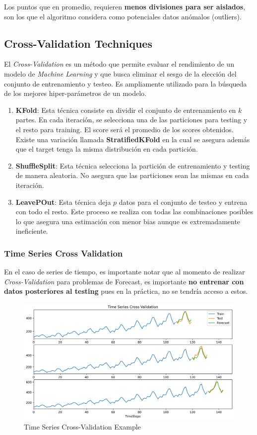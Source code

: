 Los puntos que en promedio, requieren \textbf{menos divisiones para ser aislados}, son los que el algoritmo considera como potenciales datos anómalos (outliers).

\subsection{Cross-Validation Techniques}

El \textit{Cross-Validation} es un método que permite evaluar el rendimiento de un modelo de \textit{Machine Learning} y que busca eliminar el sesgo de la elección del conjunto de entrenamiento y testeo. Es ampliamente utilizado para la búsqueda de los mejores hiper-parámetros de un modelo. 


\begin{enumerate}
    \item \textbf{KFold}: Esta técnica consiste en dividir el conjunto de entrenamiento en $k$ partes. En cada iteración, se selecciona una de las particiones para testing y el resto para training. El score será el promedio de los scores obtenidos. Existe una variación llamada \textbf{StratifiedKFold} en la cual se asegura además que el target tenga la misma distribución en cada partición.
    \item \textbf{ShuffleSplit}: Esta técnica selecciona la partición de entrenamiento y testing de manera aleatoria. No asegura que las particiones sean las mismas en cada iteración. 
    \item \textbf{LeavePOut}: Esta técnica deja $p$ datos para el conjunto de testeo y entrena con todo el resto. Este proceso se realiza con todas las combinaciones posibles lo que asegura una estimación con menor bias aunque es extremadamente ineficiente. 
\end{enumerate}

\subsubsection{Time Series Cross Validation}

En el caso de series de tiempo, es importante notar que al momento de realizar \textit{Cross-Validation} para problemas de Forecast, es importante \textbf{no entrenar con datos posteriores al testing} pues en la práctica, no se tendría acceso a estos.

\begin{figure}[H]
    \center
    \includegraphics[scale=0.45]{notebooks/Others/img/time_series_cross_validation.png}
    \caption{Time Series Cross-Validation Example}
\end{figure}








